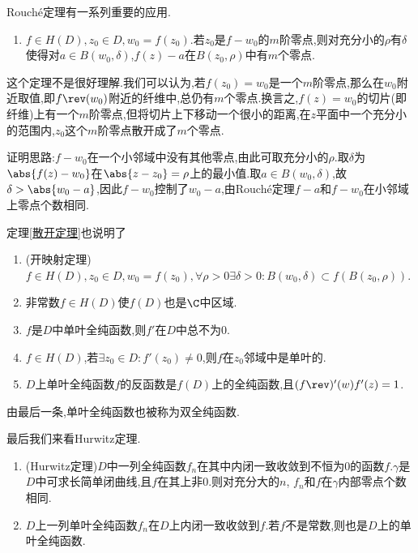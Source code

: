 \documentclass{article}
\begin{document}
Rouch\'e定理有一系列重要的应用.
\begin{enumerate}[resume]
    \item $f\in H(D),z_0\in D, w_0=f(z_0)$.若$z_0$是$f-w_0$的$m$阶零点,则对充分小的$\rho$有$\delta$使得对$a\in B(w_0,\delta)$,$f(z)-a$在$B(z_0,\rho)$中有$m$个零点.\label{散开定理}
\end{enumerate}
这个定理不是很好理解.我们可以认为,若$f(z_0)=w_0$是一个$m$阶零点,那么在$w_0$附近取值,即$f\rev(w_0)$附近的纤维中,总仍有$m$个零点.换言之,$f(z)=w_0$的切片(即纤维)上有一个$m$阶零点,但将切片上下移动一个很小的距离,在$z$平面中一个充分小的范围内,$z_0$这个$m$阶零点散开成了$m$个零点.

证明思路:$f-w_0$在一个小邻域中没有其他零点,由此可取充分小的$\rho$.取$\delta$为$\abs{f(z)-w_0}$在$\abs{z-z_0}=\rho$上的最小值.取$a\in B(w_0,\delta)$,故$\delta>\abs{w_0-a}$,因此$f-w_0$控制了$w_0-a$,由Rouch\'e定理$f-a$和$f-w_0$在小邻域上零点个数相同.

定理\ref{散开定理}也说明了
\begin{enumerate}[resume]
    \item (开映射定理)$f\in H(D),z_0\in D,w_0=f(z_0),\forall \rho>0\exists \delta>0:B(w_0,\delta)\subset f(B(z_0,\rho))$.
    \item 非常数$f\in H(D)$使$f(D)$也是$\C$中区域.\\
    \item $f$是$D$中单叶全纯函数,则$f'$在$D$中总不为0.\\
    \item $f\in H(D)$,若$\exists z_0\in D:f'(z_0)\neq 0$,则$f$在$z_0$邻域中是单叶的.\\
    \item $D$上单叶全纯函数$f$的反函数是$f(D)$上的全纯函数,且$(f\rev)'(w)f'(z)=1$.\\
\end{enumerate}
由最后一条,单叶全纯函数也被称为双全纯函数.

最后我们来看Hurwitz定理.
\begin{enumerate}[resume]
    \item (Hurwitz定理)$D$中一列全纯函数$f_n$在其中内闭一致收敛到不恒为0的函数$f$.$\gamma$是$D$中可求长简单闭曲线,且$f$在其上非0.则对充分大的$n$, $f_n$和$f$在$\gamma$内部零点个数相同.\\
    \item $D$上一列单叶全纯函数$f_n$在$D$上内闭一致收敛到$f$.若$f$不是常数,则也是$D$上的单叶全纯函数.\\
\end{enumerate}
\end{document}
